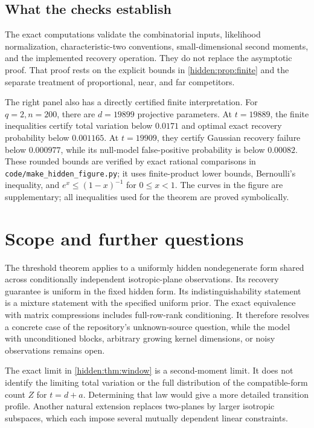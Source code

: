 \documentclass[11pt,a4paper]{article}
\theoremstyle{remark}
\begin{document}
\subsection{What the checks establish}

The exact computations validate the combinatorial inputs, likelihood normalization, characteristic-two conventions, small-dimensional second moments, and the implemented recovery operation. They do not replace the asymptotic proof. That proof rests on the explicit bounds in \cref{hidden:prop:finite} and the separate treatment of proportional, near, and far competitors.

The right panel also has a directly certified finite interpretation. For $q=2,n=200$, there are $d=19899$ projective parameters. At $t=19889$, the finite inequalities certify total variation below $0.0171$ and optimal exact recovery probability below $0.001165$. At $t=19909$, they certify Gaussian recovery failure below $0.000977$, while its null-model false-positive probability is below $0.00082$. These rounded bounds are verified by exact rational comparisons in \texttt{code/make\_hidden\_figure.py}; it uses finite-product lower bounds, Bernoulli's inequality, and $e^x\le(1-x)^{-1}$ for $0\le x<1$. The curves in the figure are supplementary; all inequalities used for the theorem are proved symbolically.

\section{Scope and further questions}

The threshold theorem applies to a uniformly hidden nondegenerate form shared across conditionally independent isotropic-plane observations. Its recovery guarantee is uniform in the fixed hidden form. Its indistinguishability statement is a mixture statement with the specified uniform prior. The exact equivalence with matrix compressions includes full-row-rank conditioning. It therefore resolves a concrete case of the repository's unknown-source question, while the model with unconditioned blocks, arbitrary growing kernel dimensions, or noisy observations remains open.

The exact limit in \cref{hidden:thm:window} is a second-moment limit. It does not identify the limiting total variation or the full distribution of the compatible-form count $Z$ for $t=d+a$. Determining that law would give a more detailed transition profile. Another natural extension replaces two-planes by larger isotropic subspaces, which each impose several mutually dependent linear constraints.
\end{document}
